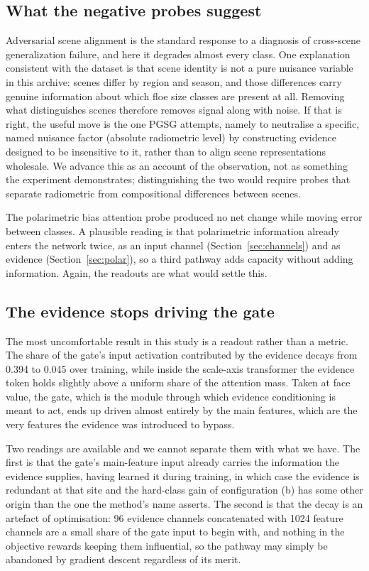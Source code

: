 \documentclass[preprint,12pt,authoryear]{elsarticle}
\begin{document}
\subsection{What the negative probes suggest}

Adversarial scene alignment is the standard response to a diagnosis of
cross-scene generalization failure, and here it degrades almost every class. One
explanation consistent with the dataset is that scene identity is not a pure
nuisance variable in this archive: scenes differ by region and season, and those
differences carry genuine information about which floe size classes are present
at all. Removing what distinguishes scenes therefore removes signal along with
noise. If that is right, the useful move is the one PGSG attempts, namely to
neutralise a specific, named nuisance factor (absolute radiometric level) by
constructing evidence designed to be insensitive to it, rather than to align
scene representations wholesale. We advance this as an account of the observation, not
as something the experiment demonstrates; distinguishing the two would require
probes that separate radiometric from compositional differences between scenes.

The polarimetric bias attention probe produced no net change while moving error
between classes. A plausible reading is that polarimetric information already
enters the network twice, as an input channel (Section~\ref{sec:channels})
and as evidence (Section~\ref{sec:polar}), so a third pathway adds capacity
without adding information. Again, the readouts are what would settle this.

\subsection{The evidence stops driving the gate}

The most uncomfortable result in this study is a readout rather than a metric.
The share of the gate's input activation contributed by the evidence decays from
0.394 to 0.045 over training, while inside the scale-axis transformer the
evidence token holds slightly above a uniform share of the attention mass. Taken
at face value, the gate, which is the module through which evidence
conditioning is meant to act, ends up driven almost entirely by the main features, which are
the very features the evidence was introduced to bypass.

Two readings are available and we cannot separate them with what we have. The
first is that the gate's main-feature input already carries the information the
evidence supplies, having learned it during training, in which case the evidence
is redundant at that site and the hard-class gain of configuration (b) has some
other origin than the one the method's name asserts. The second is that the
decay is an artefact of optimisation: 96 evidence channels concatenated with
1024 feature channels are a small share of the gate input to begin with, and
nothing in the objective rewards keeping them influential, so the pathway may
simply be abandoned by gradient descent regardless of its merit.
\end{document}

